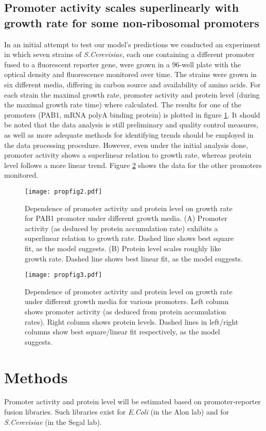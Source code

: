 \documentclass[a4page,notitlepage]{article}
\begin{document}
\subsection{Promoter activity scales superlinearly with growth rate for some non-ribosomal promoters}
In an initial attempt to test our model's predictions we conducted an experiment in which seven strains of \emph{S.Cerevisiae}, each one containing a different promoter fused to a fluorescent reporter gene, were grown in a 96-well plate with the optical density and fluorescence monitored over time.
The strains were grown in six different media, differing in carbon source and availability of amino acids.
For each strain the maximal growth rate, promoter activity and protein level (during the maximal growth rate time) where calculated.
The results for one of the promoters (PAB1, mRNA polyA binding protein) is plotted in figure \ref{gr-fl-fig}.
It should be noted that the data analysis is still preliminary and quality control measures, as well as more adequate methods for identifying trends should be employed in the data processing procedure.
However, even under the initial analysis done, promoter activity shows a superlinear relation to growth rate, whereas protein level follows a more linear trend.
Figure \ref{gr-fl-mult} shows the data for the other promoters monitored.
\begin{figure}[h]
\texttt{[image: propfig2.pdf]}
\caption{Dependence of promoter activity and protein level on growth rate for PAB1 promoter under different growth media.
(A) Promoter activity (as deduced by protein accumulation rate) exhibits a superlinear relation to growth rate.
Dashed line shows best square fit, as the model suggests.
(B) Protein level scales roughly like growth rate.
Dashed line shows best linear fit, as the model suggests.
}
\label{gr-fl-fig}
\end{figure}
\begin{figure}[h]
\texttt{[image: propfig3.pdf]}
\caption{Dependence of promoter activity and protein level on growth rate under different growth media for various promoters.
Left column shows promoter activity (as deduced from protein accumulation rates).
Right column shows protein levels.
Dashed lines in left/right columns show best square/linear fit respectively, as the model suggests.
}
\label{gr-fl-mult}
\end{figure}
\section{Methods}
Promoter activity and protein level will be estimated based on promoter-reporter fusion libraries.
Such libraries exist for \emph{E.Coli} (in the Alon lab) and for \emph{S.Cerevisiae} (in the Segal lab).
\end{document}
